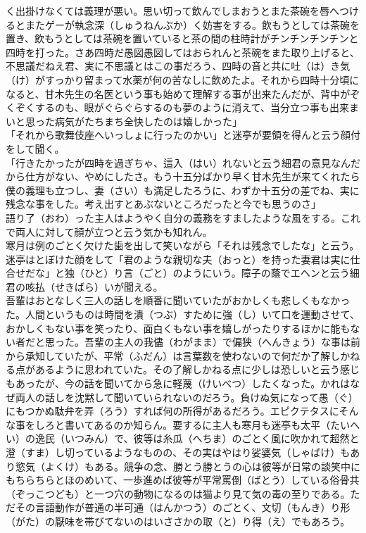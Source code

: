 \documentclass{book}
\begin{document}
く出掛けなくては義理が悪い。思い切って飲んでしまおうとまた茶碗を唇へつけるとまたゲーが執念深（しゅうねんぶか）く妨害をする。飲もうとしては茶碗を置き、飲もうとしては茶碗を置いていると茶の間の柱時計がチンチンチンチンと四時を打った。さあ四時だ愚図愚図してはおられんと茶碗をまた取り上げると、不思議だねえ君、実に不思議とはこの事だろう、四時の音と共に吐（は）き気（け）がすっかり留まって水薬が何の苦なしに飲めたよ。それから四時十分頃になると、甘木先生の名医という事も始めて理解する事が出来たんだが、背中がぞくぞくするのも、眼がぐらぐらするのも夢のように消えて、当分立つ事も出来まいと思った病気がたちまち全快したのは嬉しかった」\\
「それから歌舞伎座へいっしょに行ったのかい」と迷亭が要領を得んと云う顔付をして聞く。\\
「行きたかったが四時を過ぎちゃ、這入（はい）れないと云う細君の意見なんだから仕方がない、やめにしたさ。もう十五分ばかり早く甘木先生が来てくれたら僕の義理も立つし、妻（さい）も満足したろうに、わずか十五分の差でね、実に残念な事をした。考え出すとあぶないところだったと今でも思うのさ」\\
語り了（おわ）った主人はようやく自分の義務をすましたような風をする。これで両人に対して顔が立つと云う気かも知れん。\\
寒月は例のごとく欠けた歯を出して笑いながら「それは残念でしたな」と云う。\\
迷亭はとぼけた顔をして「君のような親切な夫（おっと）を持った妻君は実に仕合せだな」と独（ひと）り言（ごと）のようにいう。障子の蔭でエヘンと云う細君の咳払（せきばら）いが聞える。\\
吾輩はおとなしく三人の話しを順番に聞いていたがおかしくも悲しくもなかった。人間というものは時間を潰（つぶ）すために強（し）いて口を運動させて、おかしくもない事を笑ったり、面白くもない事を嬉しがったりするほかに能もない者だと思った。吾輩の主人の我儘（わがまま）で偏狭（へんきょう）な事は前から承知していたが、平常（ふだん）は言葉数を使わないので何だか了解しかねる点があるように思われていた。その了解しかねる点に少しは恐しいと云う感じもあったが、今の話を聞いてから急に軽蔑（けいべつ）したくなった。かれはなぜ両人の話しを沈黙して聞いていられないのだろう。負けぬ気になって愚（ぐ）にもつかぬ駄弁を弄（ろう）すれば何の所得があるだろう。エピクテタスにそんな事をしろと書いてあるのか知らん。要するに主人も寒月も迷亭も太平（たいへい）の逸民（いつみん）で、彼等は糸瓜（へちま）のごとく風に吹かれて超然と澄（すま）し切っているようなものの、その実はやはり娑婆気（しゃばけ）もあり慾気（よくけ）もある。競争の念、勝とう勝とうの心は彼等が日常の談笑中にもちらちらとほのめいて、一歩進めば彼等が平常罵倒（ばとう）している俗骨共（ぞっこつども）と一つ穴の動物になるのは猫より見て気の毒の至りである。ただその言語動作が普通の半可通（はんかつう）のごとく、文切（もんき）り形（がた）の厭味を帯びてないのはいささかの取（と）り得（え）でもあろう。\\
\end{document}
